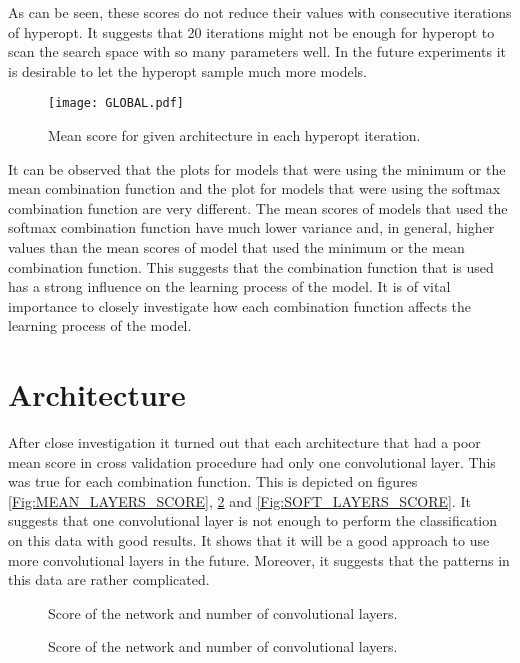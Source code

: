 \documentclass[a4paper,10pt]{report}
\begin{document}
    As can be seen, these scores do not reduce their values with consecutive iterations of hyperopt. It suggests that 20 iterations might not be enough for hyperopt to scan the search space with so many parameters well. In the future experiments it is desirable to let the hyperopt sample much more models.
    
    \begin{figure}[h!]
	\centering
	\texttt{[image: GLOBAL.pdf]}
	\caption{Mean score for given architecture in each hyperopt iteration.}
	\label{GLOBAL}
    \end{figure} 


    It can be observed that the plots for models that were using the minimum or the mean combination function and the plot for models that were using the softmax combination function are very different. The mean scores of models that used the softmax combination function have much lower variance and, in general, higher values than the mean scores of model that used the minimum or the mean combination function. This suggests that the combination function that is used has a strong influence on the learning process of the model. It is of vital importance to closely investigate how each combination function affects the learning process of the model.

    \section{Architecture}
    
    After close investigation it turned out that each architecture that had a poor mean score in cross validation procedure had only one convolutional layer. This was true for each combination function. This is depicted on figures \ref{Fig:MEAN_LAYERS_SCORE}, \ref{Fig:MIN_LAYERS_SCORE} and \ref{Fig:SOFT_LAYERS_SCORE}. It suggests that one convolutional layer is not enough to perform the classification on this data with good results. It shows that it will be a good approach to use more convolutional layers in the future. Moreover, it suggests that the patterns in this data are rather complicated.
    
    \begin{figure}[!htb]\centering
      \begin {minipage}{\textwidth}
	\caption{Score of the network and number of convolutional layers.}\label{Fig:MEAN_LAYERS_SCORE}
      \end{minipage}
      
      \begin{minipage}{\textwidth}
	\caption{Score of the network and number of convolutional layers.}\label{Fig:MIN_LAYERS_SCORE}
      \end{minipage}
     \end{figure}
     
\end{document}
